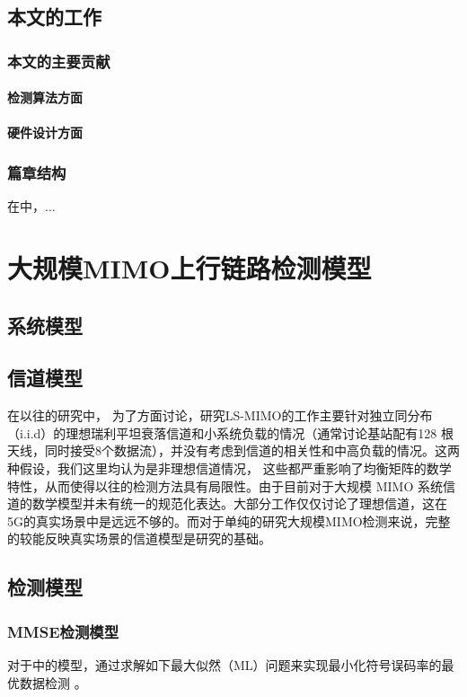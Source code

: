 \documentclass[bachelor,oneside]{seuthesis} %
\begin{document}
\begin{spacing}{1.5}
\begin{Main}
\section{本文的工作}
\subsection{本文的主要贡献}
\subsubsection{检测算法方面}


\subsubsection{硬件设计方面}

\subsection{篇章结构}
在中，...
\chapter{大规模MIMO上行链路检测模型}\label{chapter:2}

\section{系统模型}


\section{信道模型}\label{sec:chm}
在以往的研究中， 为了方面讨论，研究LS-MIMO的工作主要针对独立同分布（i.i.d）的理想瑞利平坦衰落信道和小系统负载的情况（通常讨论基站配有128 根天线，同时接受8个数据流），并没有考虑到信道的相关性和中高负载的情况。这两种假设，我们这里均认为是非理想信道情况， 这些都严重影响了均衡矩阵的数学特性，从而使得以往的检测方法具有局限性。由于目前对于大规模 MIMO 系统信道的数学模型并未有统一的规范化表达。大部分工作仅仅讨论了理想信道，这在5G的真实场景中是远远不够的。而对于单纯的研究大规模MIMO检测来说，完整的较能反映真实场景的信道模型是研究的基础。


\section{检测模型}
\subsection{MMSE检测模型}
对于中的模型，通过求解如下最大似然（ML）问题来实现最小化符号误码率的最优数据检测
\cite{paulraj2003introduction}。



\end{Main}
\end{spacing}
\end{document}
